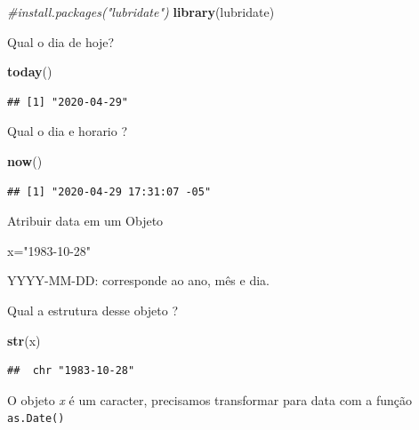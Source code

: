 \documentclass[
]{book}
\newenvironment{Shaded}{\begin{snugshade}}{\end{snugshade}}
\newcommand{\CommentTok}[1]{\textcolor[rgb]{0.56,0.35,0.01}{\textit{#1}}}
\newcommand{\KeywordTok}[1]{\textcolor[rgb]{0.13,0.29,0.53}{\textbf{#1}}}
\newcommand{\NormalTok}[1]{#1}
\newcommand{\StringTok}[1]{\textcolor[rgb]{0.31,0.60,0.02}{#1}}
\begin{document}
\begin{Shaded}
\begin{Highlighting}[]
\CommentTok{#install.packages("lubridate")}
\KeywordTok{library}\NormalTok{(lubridate)}
\end{Highlighting}
\end{Shaded}

Qual o dia de hoje?

\begin{Shaded}
\begin{Highlighting}[]
\KeywordTok{today}\NormalTok{()}
\end{Highlighting}
\end{Shaded}

\begin{verbatim}
## [1] "2020-04-29"
\end{verbatim}

Qual o dia e horario ?

\begin{Shaded}
\begin{Highlighting}[]
\KeywordTok{now}\NormalTok{()}
\end{Highlighting}
\end{Shaded}

\begin{verbatim}
## [1] "2020-04-29 17:31:07 -05"
\end{verbatim}

Atribuir data em um Objeto

\begin{Shaded}
\begin{Highlighting}[]
\NormalTok{x=}\StringTok{"1983-10-28"}
\end{Highlighting}
\end{Shaded}

YYYY-MM-DD: corresponde ao ano, mês e dia.

Qual a estrutura desse objeto ?

\begin{Shaded}
\begin{Highlighting}[]
\KeywordTok{str}\NormalTok{(x)}
\end{Highlighting}
\end{Shaded}

\begin{verbatim}
##  chr "1983-10-28"
\end{verbatim}

O objeto \emph{x} é um caracter, precisamos transformar para data com a função \texttt{as.Date()}
\end{document}
